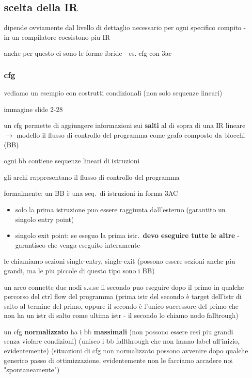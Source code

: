 \subsection{scelta della IR}

dipende ovviamente dal livello di dettaglio necessario per ogni specifico compito - in un compilatore coesistono piu IR

anche per questo ci sono le forme ibride - es. cfg con 3ac

\subsubsection{cfg}

vediamo un esempio con costrutti condizionali (non solo sequenze lineari)

immagine slide 2-28

un cfg permette di aggiungere informazioni sui \textbf{salti} al di sopra di una IR lineare $\rightarrow$ modello il flusso di controllo del programma come grafo composto da blocchi (BB)

ogni bb contiene sequenze lineari di istruzioni

gli archi rappresentano il flusso di controllo del programma


formalmente: un BB \`e una seq.~di istruzioni in forma 3AC
\begin{itemize}
  \item solo la prima istruzione puo essere raggiunta dall'esterno (garantito un singolo entry point)
  \item singolo exit point: se eseguo la prima istr.~\textbf{devo eseguire tutte le altre} - garantisco che venga eseguito interamente
\end{itemize}

le chiamiamo sezioni single-entry, single-exit (possono essere sezioni anche piu grandi, ma le piu piccole di questo tipo sono i BB)

un arco connette due nodi s.s.se il secondo puo eseguire dopo il primo in qualche percorso del ctrl flow del programma (prima istr del secondo \`e target dell'istr di salto al termine del primo, oppure il secondo \`e l'unico successore del primo che non ha un istr di salto come ultima istr - il secondo lo chiamo nodo falltrough)

un cfg \textbf{normalizzato} ha i bb \textbf{massimali} (non possono essere resi piu grandi senza violare condizioni) (unisco i bb fallthrough che non hanno label all'inizio, evidentemente) (situazioni di cfg non normalizzato possono avvenire dopo qualche generico passo di ottimizzazione, evidentemente non le facciamo accadere noi "spontaneamente")

